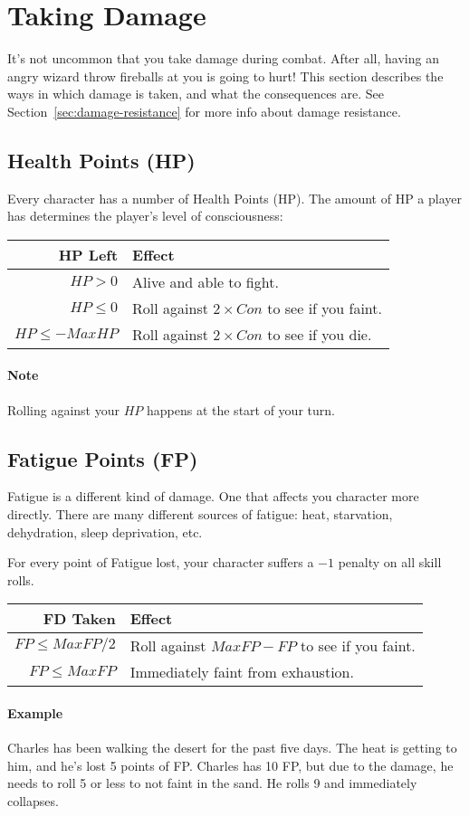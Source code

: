 \section{Taking Damage}
It's not uncommon that you take damage during combat.
After all, having an angry wizard throw fireballs at you is going to hurt!
This section describes the ways in which damage is taken, and what the consequences are.
See Section~\ref{sec:damage-resistance} for more info about damage resistance.

\subsection{Health Points (HP)}\label{sec:health-points}
Every character has a number of Health Points (HP).
The amount of HP a player has determines the player's level of consciousness:

\begin{center}
  \begin{tabular}{r | l}
    \textbf{HP Left} & \textbf{Effect} \\\hline
    $HP > 0$         & Alive and able to fight. \\
    $HP \leq 0$      & Roll against $2 \times Con$ to see if you faint. \\
    $HP \leq -MaxHP$ & Roll against $2 \times Con$ to see if you die.
  \end{tabular}
\end{center}

\paragraph{Note} Rolling against your $HP$ happens at the start of your turn.
  
\subsection{Fatigue Points (FP)}\label{sec:fatigue-points}
Fatigue is a different kind of damage.
One that affects you character more directly.
There are many different sources of fatigue: heat, starvation, dehydration, sleep deprivation, etc.

For every point of Fatigue lost, your character suffers a $-1$ penalty on all skill rolls.

\begin{center}
  \begin{tabular}{r | l}
    \textbf{FD Taken} & \textbf{Effect} \\\hline
    $FP \leq MaxFP/2$ & Roll against $MaxFP - FP$ to see if you faint. \\
    $FP \leq MaxFP$   & Immediately faint from exhaustion.
  \end{tabular}
\end{center}

\paragraph{Example} Charles has been walking the desert for the past five days.
The heat is getting to him, and he's lost 5 points of FP.
Charles has 10 FP, but due to the damage, he needs to roll 5 or less to not faint in the sand.
He rolls 9 and immediately collapses.